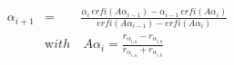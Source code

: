 


\begin{eqnarray*}
  \alpha_{i+1} & = & \frac{ \alpha_{i}\,erfi \left( A \alpha_{i-1} \right) - 
                        \alpha_{i-1}\,erfi \left( A \alpha_{i} \right)}
                      {erfi \left( A \alpha_{i-1} \right) - 
                        erfi \left( A \alpha_{i} \right)} \\
  &{\mathrm with}& \ A \alpha_{i} = \frac{r_{\alpha_{i,a}} - r_{\alpha_{i,b}}}
	                                      {r_{\alpha_{i,a}} + r_{\alpha_{i,b}}}
\end{eqnarray*}

